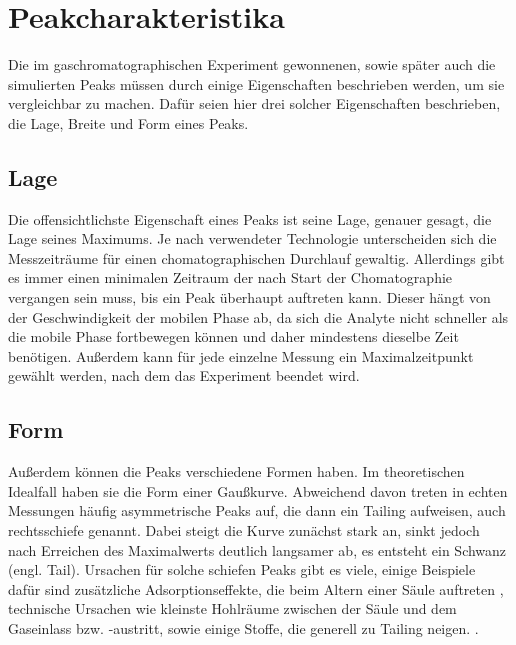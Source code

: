 \section{Peakcharakteristika}
Die im gaschromatographischen Experiment gewonnenen, sowie später auch die simulierten Peaks müssen durch einige Eigenschaften beschrieben werden, um sie vergleichbar zu machen. Dafür seien hier drei solcher Eigenschaften beschrieben, die Lage, Breite und Form eines Peaks.


\subsection{Lage}
Die offensichtlichste Eigenschaft eines Peaks ist seine Lage, genauer gesagt, die Lage seines Maximums. Je nach verwendeter Technologie unterscheiden sich die Messzeiträume für einen chomatographischen Durchlauf gewaltig. 
Allerdings gibt es immer einen minimalen Zeitraum der nach Start der Chomatographie vergangen sein muss, bis ein Peak überhaupt auftreten kann. Dieser hängt von der Geschwindigkeit der mobilen Phase ab, da sich die Analyte nicht schneller als die mobile Phase fortbewegen können und daher mindestens dieselbe Zeit benötigen. Außerdem kann für jede einzelne Messung ein Maximalzeitpunkt gewählt werden, nach dem das Experiment beendet wird. 

\subsection{Form}
Außerdem können die Peaks verschiedene Formen haben. Im theoretischen Idealfall haben sie die Form einer Gaußkurve. 
Abweichend davon treten in echten Messungen häufig asymmetrische Peaks auf, die dann ein Tailing aufweisen, auch rechtsschiefe genannt. Dabei steigt die Kurve zunächst stark an, sinkt jedoch nach Erreichen des Maximalwerts deutlich langsamer ab, es entsteht ein Schwanz (engl. Tail).
Ursachen für solche schiefen Peaks gibt es viele, einige Beispiele dafür sind zusätzliche Adsorptionseffekte, die beim Altern einer Säule auftreten \cite{kolb2003}, technische Ursachen wie kleinste Hohlräume zwischen der Säule und dem Gaseinlass bzw. -austritt, sowie einige Stoffe, die generell zu Tailing neigen. . 


